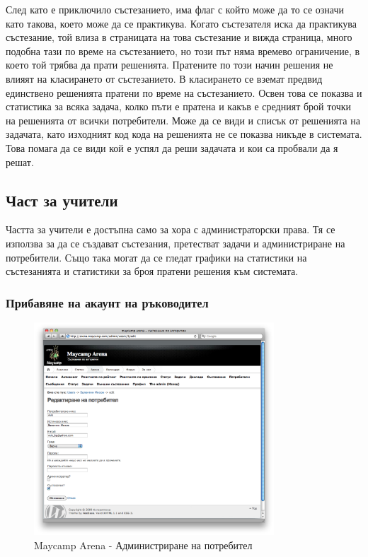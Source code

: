 \documentclass[a4paper,12pt]{article}
\begin{document}
  След като е приключило състезанието, има флаг с който може да то се означи като такова, което може да се практикува. Когато състезателя иска да практикува състезание, той влиза в страницата на това състезание и вижда страница, много подобна тази по време на състезанието, но този път няма времево ограничение, в което той трябва да прати решенията. Пратените по този начин решения не влияят на класирането от състезанието. В класирането се вземат предвид единствено решенията пратени по време на състезанието. Освен това се показва и статистика за всяка задача, колко пъти е пратена и какъв е средният брой точки на решенията от всички потребители. Може да се види и списък от решенията на задачата, като изходният код кода на решенията не се показва никъде в системата. Това помага да се види кой е успял да реши задачата и кои са пробвали да я решат.
  
  \subsection{Част за учители}

  Частта за учители е достъпна само за хора с администраторски права. Тя се използва за да се създават състезания, претестват задачи и администриране на потребители. Също така могат да се гледат графики на статистики на състезанията и статистики за броя пратени решения към системата.
  
  \subsubsection{Прибавяне на акаунт на ръководител}

  \begin{figure}[ht]
    \begin{center}
      \includegraphics[width=0.8\textwidth]{images/maycamp_arena_admin_user.png}
    \end{center}
    \caption{Maycamp Arena - Администриране на потребител}
    \label{arena_admin_user}
  \end{figure}
\end{document}
